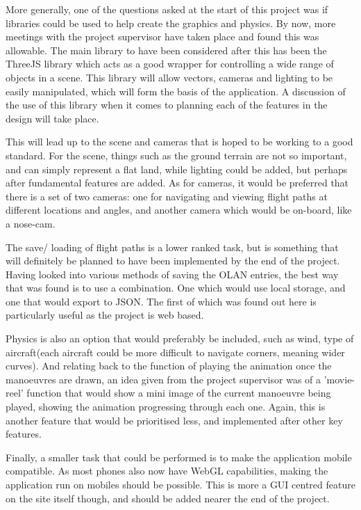 More generally, one of the questions asked at the start of this project was if libraries could be used to help create the graphics and physics. By now, more meetings with the project supervisor have taken place and found this was allowable. The main library to have been considered after this has been the ThreeJS\cite{ThreeJs} library which acts as a good wrapper for controlling a wide range of objects in a scene. This library will allow vectors, cameras and lighting to be easily manipulated, which will form the basis of the application. A discussion of the use of this library when it comes to planning each of the features in the design will take place.

This will lead up to the scene and cameras that is hoped to be working to a good standard. For the scene, things such as the ground terrain are not so important, and can simply represent a flat land, while lighting could be added, but perhaps after fundamental features are added. As for cameras, it would be preferred that there is a set of two cameras: one for navigating and viewing flight paths at different locations and angles, and another camera which would be on-board, like a nose-cam.

The save/ loading of flight paths is a lower ranked task, but is something that will definitely be planned to have been implemented by the end of the project. Having looked into various methods of saving the OLAN entries, the best way that was found is to use a combination. One which would use local storage, and one that would export to JSON. The first of which was found out here\cite{Local_Storage} is particularly useful as the project is web based.

Physics is also an option that would preferably be included, such as wind, type of aircraft(each aircraft could be more difficult to navigate corners, meaning wider curves). And relating back to the function of playing the animation once the manoeuvres are drawn, an idea given from the project supervisor was of a 'movie-reel' function that would show a mini image of the current manoeuvre being played, showing the animation progressing through each one. Again, this is another feature that would be prioritised less, and implemented after other key features.

Finally, a smaller task that could be performed is to make the application mobile compatible. As most phones also now have WebGL capabilities, making the application run on mobiles should be possible. This is more a GUI centred feature on the site itself though, and should be added nearer the end of the project.

